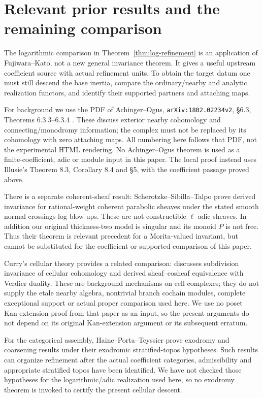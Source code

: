 \documentclass[11pt]{article}
\theoremstyle{definition}
\theoremstyle{remark}
\begin{document}
\section{Relevant prior results and the remaining comparison}
The logarithmic comparison in Theorem~\ref{thm:log-refinement} is an
application of Fujiwara--Kato, not a new general invariance theorem.
It gives a useful upstream coefficient source with actual refinement
units.  To obtain the target datum one must still descend the base
inertia, compare the ordinary/nearby and analytic realization functors,
and identify their supported partners and attaching maps.

For background we use the PDF of Achinger--Ogus,
\texttt{arXiv:1802.02234v2}, \S6.3, Theorems 6.3.3--6.3.4
\cite{AchingerOgus}.  These discuss exterior nearby cohomology and
connecting/monodromy information; the complex must not be replaced by
its cohomology with zero attaching maps.  All numbering here follows
that PDF, not the experimental HTML rendering.  No Achinger--Ogus
theorem is used as a finite-coefficient, adic or module input in this
paper.  The local proof instead uses Illusie's Theorem 8.3,
Corollary 8.4 and \S5, with the coefficient passage proved above.

There is a separate coherent-sheaf result: Scherotzke--Sibilla--Talpo
\cite[Theorem B/Proposition 3.9]{SSTMcKay} prove derived invariance for
rational-weight coherent parabolic sheaves under the stated smooth
normal-crossings log blow-ups.  These are not constructible
$\ell$-adic sheaves.  In addition our original thickness-two model is
singular and its monoid $P$ is not free.  Thus their theorem is relevant
precedent for a Morita-valued invariant, but cannot be substituted for
the coefficient or supported comparison of this paper.

Curry's cellular theory provides a related comparison:
\cite[\S6.3, Theorem 6.12; Theorem 7.9 and \S7.4]{CurryCellular}
discusses subdivision invariance of cellular cohomology and derived
sheaf--cosheaf equivalence with Verdier duality.  These are background
mechanisms on cell complexes; they do not supply the etale nearby
algebra, nontrivial branch cochain modules, complete exceptional support
or actual proper comparison used here.  We use no poset Kan-extension
proof from that paper as an input, so the present arguments do not
depend on its original Kan-extension argument or its subsequent erratum.

For the categorical assembly, Haine--Porta--Teyssier
\cite{HPTExodromy} prove exodromy and coarsening results under their
exodromic stratified-topos hypotheses.  Such results can organize
refinement after the actual coefficient categories, admissibility and
appropriate stratified topos have been identified.  We have not checked
those hypotheses for the logarithmic/adic realization used here, so
no exodromy theorem is invoked to certify the present cellular descent.
\end{document}
